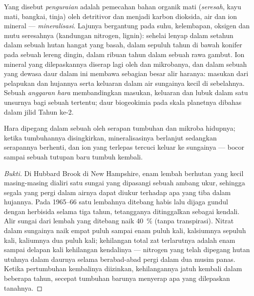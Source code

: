 \begin{definition}\label{def:b1:ecosystem-dynamics:decomposition}
Yang disebut \emph{penguraian} adalah pemecahan bahan organik mati
(\emph{seresah}, kayu mati, bangkai, tinja) oleh detritivor dan
 menjadi karbon dioksida, air dan ion mineral ---
\emph{mineralisasi}. Lajunya bergantung pada suhu, kelembapan, oksigen
dan mutu seresahnya (kandungan nitrogen, lignin): sehelai  lenyap
dalam setahun dalam sebuah hutan hangat yang basah, dalam sepuluh
tahun di bawah konifer pada sebuah lereng dingin, dalam ribuan tahun
dalam sebuah rawa gambut. Ion mineral yang dilepaskannya diserap lagi
oleh  dan mikrobanya, dan dalam sebuah  yang dewasa daur
dalam ini membawa sebagian besar alir haranya: masukan dari pelapukan
dan hujannya serta keluaran dalam air sungainya kecil di sebelahnya.
Sebuah \emph{anggaran hara} membandingkan masukan, keluaran dan lubuk
dalam satu unsurnya bagi sebuah  tertentu; daur biogeokimia
pada skala planetnya dibahas dalam jilid Tahun ke-2.
\end{definition}

\begin{proposition}\label{prop:b1:ecosystem-dynamics:retention}
Hara dipegang dalam sebuah  oleh serapan tumbuhan dan mikroba
hidupnya; ketika tumbuhannya disingkirkan, mineralisasinya berlanjut
sedangkan serapannya berhenti, dan ion yang terlepas tercuci keluar ke
sungainya ---  bocor sampai sebuah tutupan baru tumbuh
kembali.
\end{proposition}
\begin{proof}[Bukti]
Di Hubbard Brook di New Hampshire, enam lembah berhutan yang kecil
masing-masing dialiri satu sungai yang dipasangi sebuah ambang ukur,
sehingga segala yang pergi dalam airnya dapat diukur terhadap apa yang
tiba dalam hujannya. Pada 1965--66 satu lembahnya ditebang habis lalu
dijaga gundul dengan herbisida selama tiga tahun, tetangganya
ditinggalkan sebagai kendali. Alir sungai dari lembah yang ditebang
naik \qty{40}{\%} (tanpa transpirasi). Nitrat dalam sungainya naik
empat puluh sampai enam puluh kali, kalsiumnya sepuluh kali, kaliumnya
dua puluh kali; kehilangan total zat terlarutnya adalah enam sampai
delapan kali kehilangan kendalinya --- nitrogen yang telah dipegang
hutan utuhnya dalam daurnya selama berabad-abad pergi dalam dua musim
panas. Ketika pertumbuhan kembalinya diizinkan, kehilangannya jatuh
kembali dalam beberapa tahun, secepat tumbuhan barunya menyerap apa
yang dilepaskan tanahnya.
\end{proof}

